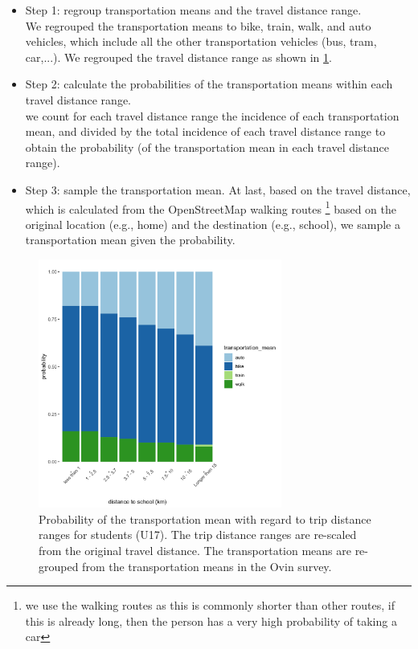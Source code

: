\documentclass[]{article}
\begin{document}
\begin{itemize}
    \item Step 1: regroup transportation means and the travel distance range. \\ We regrouped the transportation means to bike, train, walk, and auto vehicles, which include all the other transportation vehicles (bus, tram, car,...). We regrouped the travel distance range as shown in \cref{stu_mode_dist}. 
    
    \item Step 2: calculate the probabilities of the transportation means within each travel distance range. \\ we count for each travel distance range the incidence of each transportation mean, and divided by the total incidence of each travel distance range to obtain the probability (of the transportation mean in each travel distance range).
    
    \item Step 3: sample the transportation mean. At last, based on the travel distance, which is calculated from the OpenStreetMap walking routes \footnote{we use the walking routes as this is commonly shorter than other routes, if this is already long, then the person has a very high probability of taking a car} based on the original location (e.g., home) and the destination (e.g., school), we sample a transportation mean given the probability.   
    
\end{itemize}

\begin{figure}[h]
    \centering
    \includegraphics[width=8cm]{figure/ditance_vs_transmean_schoolstud.png}
    \caption{Probability of the transportation mean with regard to trip distance ranges for students (U17). The trip distance ranges are re-scaled from the original travel distance. The transportation means are re-grouped from the transportation means in the Ovin survey.}
    \label{stu_mode_dist}
\end{figure} 
\end{document}

